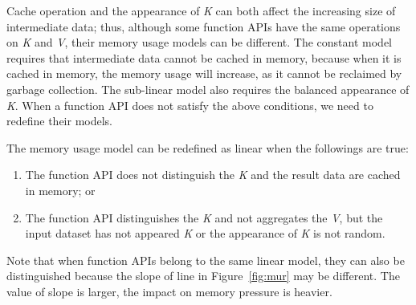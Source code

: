 Cache operation and the appearance of \textit{K} can both affect the increasing size of intermediate data; thus, although some function APIs have the same operations on \textit{K} and \textit{V}, their memory usage models can be different. The constant model requires that intermediate data cannot be cached in memory, because when it is cached in memory, the memory usage will increase, as it cannot be reclaimed by garbage collection. The sub-linear model also requires the balanced appearance of \textit{K}. When a function API does not satisfy the above conditions, we need to redefine their models.

\begin{lemma}[Linear] The memory usage model can be redefined as linear when the followings are true:
\begin{enumerate}
\item The function API does not distinguish the \textit{K} and the result data are cached in memory; or
\item The function API distinguishes the \textit{K} and not aggregates the \textit{V}, but the input dataset has not appeared \textit{K} or the appearance of \textit{K} is not random.
\end{enumerate}
\end{lemma}

Note that when function APIs belong to the same linear model, they can also be distinguished because the slope of line in Figure~\ref{fig:mur} may be different. The value of slope is larger, the impact on memory pressure is heavier.



